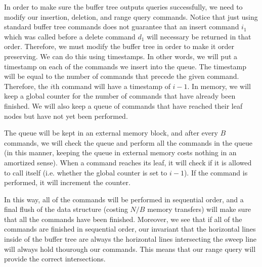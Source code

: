 \documentclass[psamsfonts]{amsart}
\newenvironment{sol}{\vspace{0.25cm}{\large \bfseries Solution:}}{\qedsymbol}
\begin{document}
\begin{sol}
In order to make sure the buffer tree outputs queries successfully, we need to modify our insertion, deletion, and range query commands. Notice that just using standard buffer tree commands does not guarantee that an insert command $i_1$ which was called before a delete command $d_1$ will necessary be returned in that order. Therefore, we must modify the buffer tree in order to make it order preserving. We can do this using timestamps. In other words, we will put a timestamp on each of the commands we insert into the queue. The timestamp will be equal to the number of commands that precede the given command. Therefore, the $i$th command will have a timestamp of $i-1$. In memory, we will keep a global counter for the number of commands that have already been finished. We will also keep a queue of commands that have reached their leaf nodes but have not yet been performed. 

The queue will be kept in an external memory block, and after every $B$ commands, we will check the queue and perform all the commands in the queue (in this manner, keeping the queue in external memory costs nothing in an amortized sense). When a command reaches its leaf, it will check if it is allowed to call itself (i.e. whether the global counter is set to $i-1$). If the command is performed, it will increment the counter. 

In this way, all of the commands will be performed in sequential order, and a final flush of the data structure (costing $N/B$ memory transfers) will make sure that all the commands have been finished. Moreover, we see that if all of the commands are finished in sequential order, our invariant that the horizontal lines inside of the buffer tree are always the horizontal lines intersecting the sweep line will always hold thourough our commands. This means that our range query will provide the correct intersections. 
\end{sol}
\end{document}
